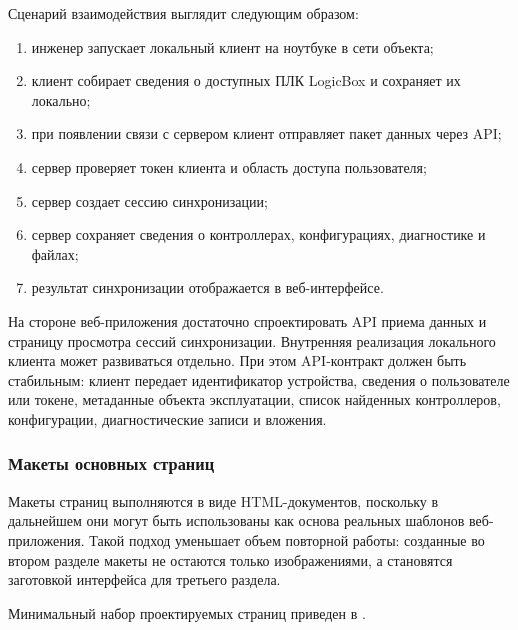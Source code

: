 Сценарий взаимодействия выглядит следующим образом:
\begin{enumerate}
    \item инженер запускает локальный клиент на ноутбуке в сети объекта;
    \item клиент собирает сведения о доступных ПЛК LogicBox и сохраняет их локально;
    \item при появлении связи с сервером клиент отправляет пакет данных через API;
    \item сервер проверяет токен клиента и область доступа пользователя;
    \item сервер создает сессию синхронизации;
    \item сервер сохраняет сведения о контроллерах, конфигурациях, диагностике и файлах;
    \item результат синхронизации отображается в веб-интерфейсе.
\end{enumerate}

На стороне веб-приложения достаточно спроектировать API приема данных и страницу
просмотра сессий синхронизации. Внутренняя реализация локального клиента может
развиваться отдельно. При этом API-контракт должен быть стабильным: клиент
передает идентификатор устройства, сведения о пользователе или токене,
метаданные объекта эксплуатации, список найденных контроллеров, конфигурации,
диагностические записи и вложения.

\subsubsection{Макеты основных страниц}

Макеты страниц выполняются в виде HTML-документов, поскольку в дальнейшем они
могут быть использованы как основа реальных шаблонов веб-приложения. Такой
подход уменьшает объем повторной работы: созданные во втором разделе макеты не
остаются только изображениями, а становятся заготовкой интерфейса для третьего
раздела.

Минимальный набор проектируемых страниц приведен в .

